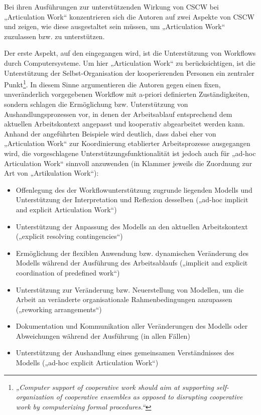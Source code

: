 Bei ihren Ausführungen zur unterstützenden Wirkung von \gls{CSCW} bei „Articulation Work“ konzentrieren sich die Autoren auf zwei Aspekte von \gls{CSCW} und zeigen, wie diese ausgestaltet sein müssen, um „Articulation Work“ zuzulassen bzw. zu unterstützen. 

Der erste Aspekt, auf den eingegangen wird, ist die Unterstützung von Workflows durch Computersysteme. Um hier „Articulation Work“ zu berücksichtigen, ist die Unterstützung der Selbst-Organisation der kooperierenden Personen ein zentraler Punkt\footnote{\emph{„Computer support of cooperative work should aim at supporting self-organization of cooperative ensembles as opposed to disrupting cooperative work by computerizing formal procedures.“}\citep[][S. 17]{Schmidt92}}. In diesem Sinne argumentieren die Autoren gegen einen fixen, unveränderlich vorgegebenen Workflow mit a-priori definierten Zuständigkeiten, sondern schlagen die Ermöglichung bzw. Unterstützung von Aushandlungsprozessen vor, in denen der Arbeitsablauf entsprechend dem aktuellen Arbeitskontext angepasst und kooperativ abgearbeitet werden kann. Anhand der angeführten Beispiele wird deutlich, dass dabei eher von „Articulation Work“ zur Koordinierung etablierter Arbeitsprozesse ausgegangen wird, die vorgeschlagene Unterstützungsfunktionalität ist jedoch auch für „ad-hoc Articulation Work“ sinnvoll anzuwenden (in Klammer jeweils die Zuordnung zur Art von „Artikulation Work“):
\begin{itemize}
	\item Offenlegung des der Workflowunterstützung zugrunde liegenden Modells und Unterstützung der Interpretation und Reflexion desselben („ad-hoc implicit and explicit Articulation Work“)
	\item Unterstützung der Anpassung des Modells an den aktuellen Arbeitskontext („explicit resolving contingencies“)
	\item Ermöglichung der flexiblen Anwendung bzw. dynamischen Veränderung des Modells während der Ausführung des Arbeitsablaufs („implicit and explicit coordination of predefined work“)
	\item Unterstützung zur Veränderung bzw. Neuerstellung von Modellen, um die Arbeit an veränderte organisationale Rahmenbedingungen anzupassen („reworking arrangements“)
	\item Dokumentation und Kommunikation aller Veränderungen des Modells oder Abweichungen während der Ausführung (in allen Fällen)
	\item Unterstützung der Aushandlung eines gemeinsamen Verständnisses des Modells („ad-hoc explicit Articulation Work“)
\end{itemize}

